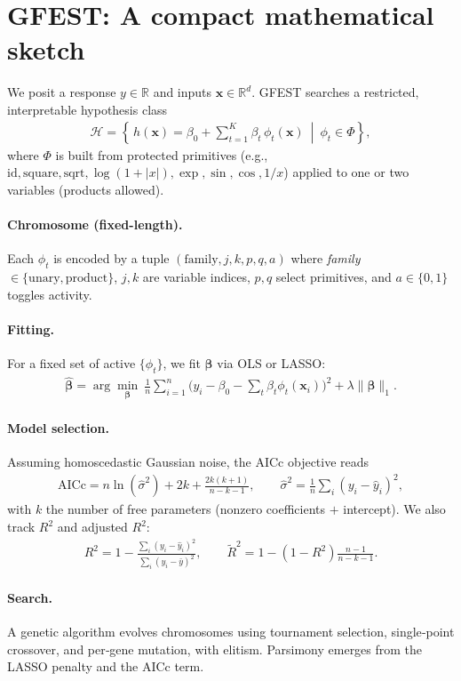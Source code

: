 \documentclass[10pt]{article}
\begin{document}
\section*{GFEST: A compact mathematical sketch}
We posit a response $y\in\mathbb{R}$ and inputs $\mathbf{x}\in\mathbb{R}^d$.
GFEST searches a restricted, interpretable hypothesis class
\begin{align}
\mathcal{H}=\left\{\, h(\mathbf{x})=\beta_0+\sum_{t=1}^K \beta_t\, \phi_t(\mathbf{x}) \ \middle|\ \phi_t\in\Phi \right\},
\end{align}
where $\Phi$ is built from protected primitives (e.g., $\mathrm{id}, \mathrm{square}, \mathrm{sqrt}, \log(1{+}|x|), \exp, \sin, \cos, 1/x$) applied to one or two variables (products allowed).

\paragraph{Chromosome (fixed-length).} Each $\phi_t$ is encoded by a tuple $(\text{family}, j, k, p, q, a)$ where \emph{family}$\in\{\text{unary}, \text{product}\}$, $j,k$ are variable indices, $p,q$ select primitives, and $a\in\{0,1\}$ toggles activity.

\paragraph{Fitting.} For a fixed set of active $\{\phi_t\}$, we fit $\bm{\beta}$ via OLS or LASSO:
\begin{align}
\widehat{\bm{\beta}}=\arg\min_{\bm{\beta}}\ \frac{1}{n}\sum_{i=1}^n\big(y_i-\beta_0-\sum_t\beta_t\phi_t(\mathbf{x}_i)\big)^2 + \lambda\|\bm{\beta}\|_1.
\end{align}

\paragraph{Model selection.} Assuming homoscedastic Gaussian noise, the AICc objective reads
\begin{align}
\mathrm{AICc}=n\ln(\widehat{\sigma}^2)+2k+\frac{2k(k+1)}{n-k-1},
\qquad \widehat{\sigma}^2=\frac{1}{n}\sum_i (y_i-\hat y_i)^2,
\end{align}
with $k$ the number of free parameters (nonzero coefficients $+$ intercept). We also track $R^2$ and adjusted $R^2$:
\begin{align}
R^2=1-\frac{\sum_i(y_i-\hat y_i)^2}{\sum_i(y_i-\bar y)^2},\qquad
\widetilde{R}^2=1-(1-R^2)\frac{n-1}{n-k-1}.
\end{align}

\paragraph{Search.} A genetic algorithm evolves chromosomes using tournament selection, single‑point crossover, and per‑gene mutation, with elitism. Parsimony emerges from the LASSO penalty and the AICc term.
\end{document}
